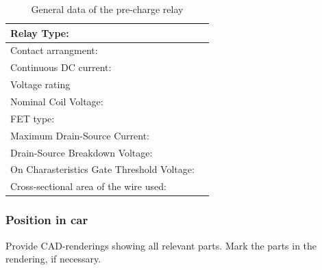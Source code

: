 \begin{table}[H]
	\centering
	\caption{General data of the pre-charge relay}
	\begin{tabularx}{\textwidth}{|X|X|}
		\hline
		Relay Type: & \\[\TableSize]
		\hline
		Contact arrangment: &  \\[\TableSize]
		\hline
		Continuous DC current:  & \\[\TableSize]
		\hline
		Voltage rating  & \\[\TableSize]
		\hline
		Nominal Coil Voltage: &  \\[\TableSize]
		\hline
		FET type: &  \\[\TableSize]
		\hline
		Maximum Drain-Source Current: &  \\[\TableSize]
		\hline
		Drain-Source Breakdown Voltage: &  \\[\TableSize]
		\hline
		On Charasteristics Gate Threshold Voltage: & \\[\TableSize]
		\hline
		Cross-sectional area of the wire used: & \\[\TableSize]
		\hline
	\end{tabularx}%
	\label{tab:precharge-relay}%
\end{table}%

\subsubsection{Position in car}
Provide CAD-renderings showing all relevant parts. Mark the parts in the rendering, if necessary.